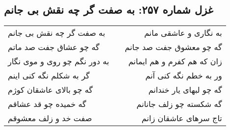 \begin{center}
\section*{غزل شماره ۲۵۷: به صفت گر چه نقش بی جانم}
\label{sec:257}
\begin{longtable}{l p{0.5cm} r}
به صفت گر چه نقش بی جانم
&&
به نگاری و عاشقی مانم
\\
گه چو عشاق جفت صد ماتم
&&
گه چو معشوق جفت صد جانم
\\
به دور نگم چو روی و موی نگار
&&
زان که هم کفرم و هم ایمانم
\\
گر به شکلم نگه کنی اینم
&&
ور به خطم نگه کنی آنم
\\
گه چو بالای عاشقان کوژم
&&
گه چو لبهای یار خندانم
\\
گه خمیده چو قد عشاقم
&&
گه شکسته چو زلف جانانم
\\
صفت خد و زلف معشوقم
&&
تاج سرهای عاشقان زانم
\\
\end{longtable}
\end{center}
